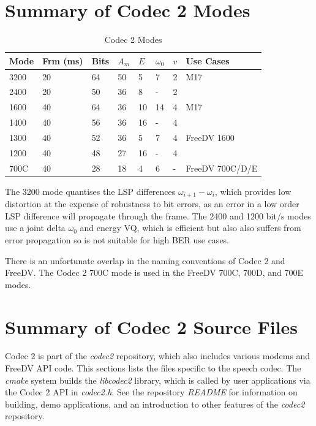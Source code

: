 \documentclass{article}
\begin{document}
{\section{Summary of Codec 2 Modes}
\label{sect:codec2_modes}

\begin{table}[H]
\label{tab:codec2_modes}
\centering
\begin{tabular}{p{0.75cm}|p{0.75cm}|p{0.5cm}|p{0.5cm}|p{0.5cm}|p{0.5cm}|p{0.5cm}|p{3cm}}
\hline
Mode & Frm (ms) & Bits & $A_m$ & $E$ & $\omega_0$ & $v$ & Use Cases \\
\hline
3200 & 20 & 64 & 50 & 5  & 7  & 2 & M17 \\
2400 & 20 & 50 & 36 & 8  & -  & 2 \\
1600 & 40 & 64 & 36 & 10 & 14 & 4 & M17 \\
1400 & 40 & 56 & 36 & 16 & -  & 4 \\
1300 & 40 & 52 & 36 & 5  & 7  & 4 & FreeDV 1600 \\
1200 & 40 & 48 & 27 & 16 & -  & 4 & \\
700C & 40 & 28 & 18 & 4  & 6  & - & FreeDV 700C/D/E \\
\hline
\end{tabular}
\caption{Codec 2 Modes}
\end{table}

The 3200 mode quantises the LSP differences $\omega_{i+1}-\omega_i$, which provides low distortion at the expense of robustness to bit errors, as an error in a low order LSP difference will propagate through the frame.  The 2400 and 1200 bit/s modes use a joint delta $\omega_0$ and energy VQ, which is efficient but also also suffers from error propagation so is not suitable for high BER use cases.

There is an unfortunate overlap in the naming conventions of Codec 2 and FreeDV.  The Codec 2 700C mode is used in the FreeDV 700C, 700D, and 700E modes.

\section{Summary of Codec 2 Source Files}
\label{sect:source_files}

Codec 2 is part of the \emph{codec2} repository, which also includes various modems and FreeDV API code.  This sections lists the files specific to the speech codec. The \emph{cmake} system builds the \emph{libcodec2} library, which is called by user applications via the Codec 2 API in \emph{codec2.h}.  See the repository \emph{README} for information on building, demo applications, and an introduction to other features of the \emph{codec2} repository.
 
}
\end{document}
